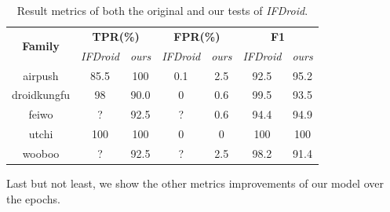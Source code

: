 \begin{table}[H]
    \centering
    \begin{tabular}{|c|cc|cc|cc|}
        \hline
        \multirow{2}{3.5em}{\textbf{Family}} & \multicolumn{2}{c|}{\textbf{TPR(\%)}} & \multicolumn{2}{c|}{\textbf{FPR(\%)}} & \multicolumn{2}{c|}{\textbf{F1}} \\
        & \textit{IFDroid} & \textit{ours} & \textit{IFDroid} & \textit{ours} & \textit{IFDroid} & \textit{ours} \\
        \hline
        airpush & 85.5 & 100 & 0.1 & 2.5 & 92.5 & 95.2 \\
        droidkungfu & 98 & 90.0 & 0 & 0.6 & 99.5 & 93.5 \\
        feiwo & ? & 92.5 & ? & 0.6 & 94.4 & 94.9 \\
        utchi & 100 & 100 & 0 & 0 & 100 & 100 \\
        wooboo & ? & 92.5 & ? & 2.5 & 98.2 & 91.4 \\
        \hline
    \end{tabular}
    \caption{Result metrics of both the original and our tests of \textit{IFDroid}.}
    \label{tab:IFDroidVS}
\end{table}

\noindent Last but not least, we show the other metrics improvements of our model over the epochs. \\

